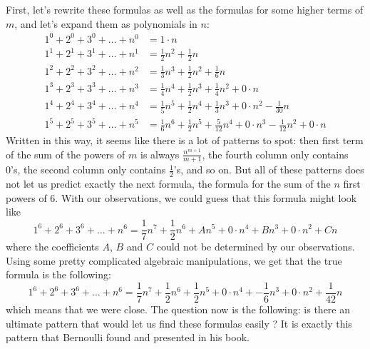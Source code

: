First, let's rewrite these formulas as well as the formulas for some higher terms of $m$, and let's expand them as polynomials in $n$:
\begin{align*}
    1^0 + 2^0 + 3^0 + \dots + n^0 &= 1\cdot n \\
    1^1 + 2^1 + 3^1 + \dots + n^1 &= \frac{1}{2}n^2 + \frac{1}{2}n \\
    1^2 + 2^2 + 3^2 + \dots + n^2 &= \frac{1}{3}n^3 + \frac{1}{2}n^2 + \frac{1}{6}n \\
    1^3 + 2^3 + 3^3 + \dots + n^3 &= \frac{1}{4}n^4 + \frac{1}{2}n^3 + \frac{1}{4}n^2 + 0\cdot n \\
    1^4 + 2^4 + 3^4 + \dots + n^4 &= \frac{1}{5}n^5 + \frac{1}{2}n^4 + \frac{1}{3}n^3 + 0\cdot n^2 - \frac{1}{30}n \\
    1^5 + 2^5 + 3^5 + \dots + n^5 &= \frac{1}{6}n^6 + \frac{1}{2}n^5 + \frac{5}{12}n^4 + 0\cdot n^3 - \frac{1}{12}n^2 + 0\cdot n
\end{align*}
Written in this way, it seems like there is a lot of patterns to spot: then first term of the sum of the powers of $m$ is always $\frac{n^{m+1}}{m+1}$, the fourth column only contains 0's, the second column only contains $\frac{1}{2}$'s, and so on. But all of these patterns does not let us predict exactly the next formula, the formula for the sum of the $n$ first powers of 6. With our observations, we could guess that this formula might look like
$$1^6 + 2^6 + 3^6 + \dots + n^6 = \frac{1}{7}n^7 + \frac{1}{2}n^6 + An^5 + 0\cdot n^4 + Bn^3 + 0\cdot n^2 + Cn$$
where the coefficients $A$, $B$ and $C$ could not be determined by our observations. Using some pretty complicated algebraic manipulations, we get that the true formula is the following:
$$1^6 + 2^6 + 3^6 + \dots + n^6 = \frac{1}{7}n^7 + \frac{1}{2}n^6 + \frac{1}{2}n^5 + 0\cdot n^4 + -\frac{1}{6}n^3 + 0\cdot n^2 + \frac{1}{42}n$$
which means that we were close. The question now is the following: is there an ultimate pattern that would let us find these formulas easily ? It is exactly this pattern that Bernoulli found and presented in his book.

